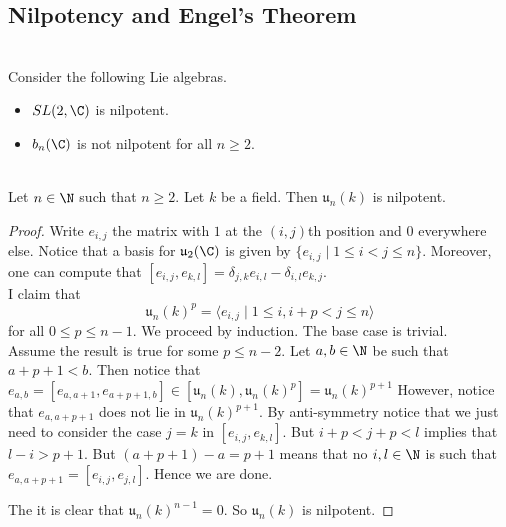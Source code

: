 \documentclass[a4paper]{article}
\begin{document}
\subsection{Nilpotency and Engel's Theorem}
\begin{eg}{}{}\\
Consider the following Lie algebras. 
\begin{itemize}
\item $SL(2,\C)$ is nilpotent. 
\item $b_n(\C)$ is not nilpotent for all $n\geq 2$. 
\end{itemize}
\end{eg}

\begin{eg}{}{}\\
Let $n\in\N$ such that $n\geq 2$. Let $k$ be a field. Then $\mathfrak{u}_n(k)$ is nilpotent. 
\begin{proof}
Write $e_{i,j}$ the matrix with $1$ at the $(i,j)$th position and $0$ everywhere else. Notice that a basis for $\mathfrak{u}_2(\C)$ is given by $\{e_{i,j}\;|\;1\leq i< j\leq n\}$. Moreover, one can compute that $[e_{i,j},e_{k,l}]=\delta_{j,k}e_{i,l}-\delta_{i,l}e_{k,j}$. \\

I claim that $$\mathfrak{u}_n(k)^p=\langle e_{i,j}\;|\;1\leq i, i+p<j\leq n\rangle$$ for all $0\leq p\leq n-1$. We proceed by induction. The base case is trivial. \\

Assume the result is true for some $p\leq n-2$. Let $a,b\in\N$ be such that $a+p+1<b$. Then notice that $e_{a,b}=[e_{a,a+1},e_{a+p+1,b}]\in[\mathfrak{u}_n(k),\mathfrak{u}_n(k)^p]=\mathfrak{u}_n(k)^{p+1}$ However, notice that $e_{a,a+p+1}$ does not lie in $\mathfrak{u}_n(k)^{p+1}$. By anti-symmetry notice that we just need to consider the case $j=k$ in $[e_{i,j},e_{k,l}]$. But $i+p<j+p<l$ implies that $l-i>p+1$. But $(a+p+1)-a=p+1$ means that no $i,l\in\N$ is such that $e_{a,a+p+1}=[e_{i,j},e_{j,l}]$. Hence we are done. 

The it is clear that $\mathfrak{u}_n(k)^{n-1}=0$. So $\mathfrak{u}_n(k)$ is nilpotent. 
\end{proof}
\end{eg}
\end{document}
